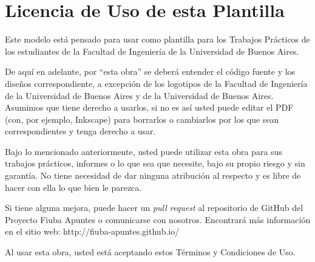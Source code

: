 \section{Licencia de Uso de esta Plantilla}
Este modelo está pensado para usar como plantilla para los Trabajos Prácticos de los estudiantes de la Facultad de Ingeniería de la Universidad de Buenos Aires.

De aquí en adelante, por ``esta obra'' se deberá entender el código fuente y los diseños correspondiente, a excepción de los logotipos de la Facultad de Ingeniería de la Universidad de Buenos Aires y de la Universidad de Buenos Aires. Asumimos que tiene derecho a usarlos, si no es así usted puede editar el PDF (con, por ejemplo, Inkscape) para borrarlos o cambiarlos por los que sean correspondientes y tenga derecho a usar.

Bajo lo mencionado anteriormente, usted puede utilizar esta obra para sus trabajos prácticos, informes o lo que sea que necesite, bajo su propio riesgo y sin garantía. No tiene necesidad de dar ninguna atribución al respecto y es libre de hacer con ella lo que bien le parezca. 

Si tiene alguna mejora, puede hacer un \textit{pull request} al repositorio de GitHub del Proyecto Fiuba Apuntes o comunicarse con nosotros. Encontrará más información en el sitio web: http://fiuba-apuntes.github.io/

Al usar esta obra, usted está aceptando estos Términos y Condiciones de Uso.